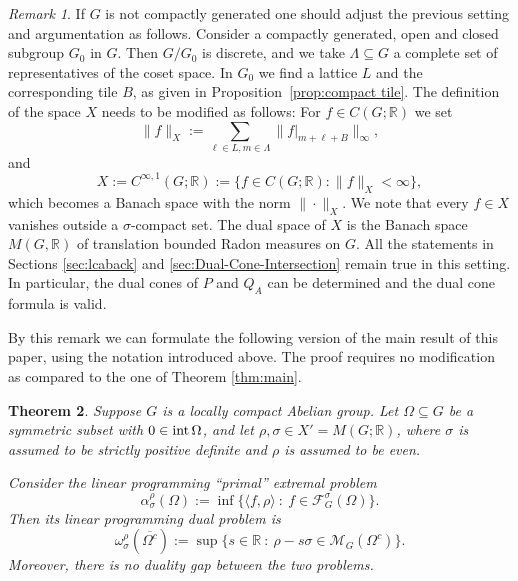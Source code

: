 \documentclass[[a4paper,english,12pt]{amsart}
\theoremstyle{plain}
\newtheorem{theorem}{Theorem}[section]
\theoremstyle{remark}
\newtheorem{remark}[theorem]{Remark}
\newcommand{\intt}{\mbox{\rm int\,}}
\newcommand{\FF}{\mathcal{F}}
\newcommand{\MM}{\mathcal{M}}
\newcommand{\RR}{\mathbb R}
\newcommand{\si}{\sigma}
\newcommand{\rh}{\rho}
\begin{document}
\begin{remark}\label{rem:mainmain}
 If $G$ is not compactly generated one should adjust the previous setting and argumentation as follows.  Consider a compactly generated, open and closed subgroup $G_0$ in $G$. Then $G/G_0$ is discrete, and we take $\Lambda\subseteq G$ a complete set of representatives of the coset space. In $G_0$ we find a lattice $L$ and the corresponding tile $B$, as  given in Proposition~\ref{prop:compact tile}. The definition of the space $X$ needs to be modified as follows: For $f\in C(G;\RR)$ we set
 \[
\|f\|_X:=\sum_{\ell\in L, m\in \Lambda}\|f|_{m+\ell+B}\|_\infty,
 \]
 and
\[
X:=C^{\infty,1}(G;\RR):=\{f\in C(G;\RR):\|f\|_X<\infty\},
\]
which becomes a Banach space with the norm $\|\cdot \|_X$. We note that every $f\in X$ vanishes outside a $\sigma$-compact set. The dual space of $X$ is the Banach space $M(G,\RR)$ of translation bounded Radon measures on $G$.
All the statements in Sections \ref{sec:lcaback} and \ref{sec:Dual-Cone-Intersection} remain true in this setting. In particular, the dual cones of $P$ and $Q_A$ can be determined and the dual cone formula is valid.
\end{remark}

By this remark we can formulate the following version of the main result of this paper, using the notation introduced above. The proof requires no modification as compared to the one of Theorem \ref{thm:main}.

\begin{theorem}\label{thm:mainmain}
	Suppose  $G$ is a  locally compact  Abelian group. Let $\Omega\subseteq G$ be a symmetric subset with $0\in \intt \Omega$, and let $\rh,\si\in X'=M(G;\RR)$, where  $\si$ is assumed to be  strictly positive definite and $\rh$ is assumed to be even.

Consider the linear programming ``primal'' extremal problem
\[
\alpha_\si^\rh (\Omega):= \inf \{\langle f,\rh\rangle~:~f \in \FF_G^\si(\Omega)\}.
\]
Then its linear programming dual problem is
\[
\omega_\si^\rh(\overline{\Omega^c}):= \sup \{ s \in \RR ~:~\rh- s \si  \in \MM_G(\Omega^c) \}.
\]
Moreover, there is no duality gap between the two problems.
\end{theorem}
\end{document}
